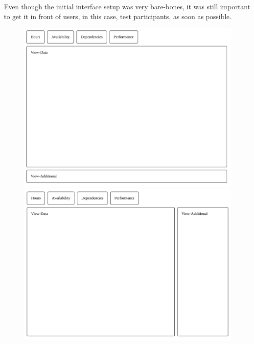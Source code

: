 \documentclass[nofilelist,dvipsnames]{cslthse-msc}
\begin{document}
        Even though the initial interface setup was very bare-bones, it was
        still important to get it in front of users, in this case, test
        participants, as soon as possible.

        \begin{figure}[h!]
          \centering
          \begin{minipage}{.49\textwidth}
            \includegraphics[width=\linewidth]{ui11.pdf}
          \end{minipage}
          \begin{minipage}{.49\textwidth}
            \includegraphics[width=\linewidth]{ui12.pdf}
          \end{minipage}
          \begin{minipage}{.49\textwidth}

\end{minipage}
\end{figure}
\end{document}
